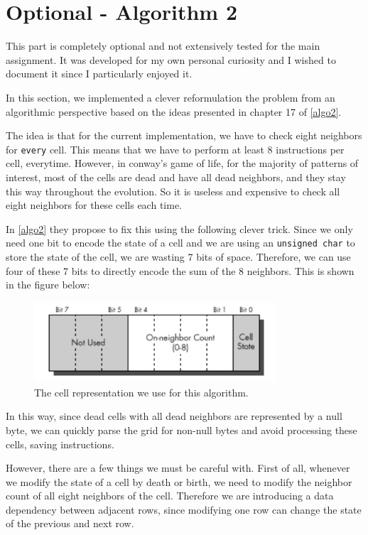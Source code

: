 \documentclass{report}
\begin{document}
\section{Optional - Algorithm 2}

This part is completely optional and not extensively tested for the main 
assignment. It was developed for my own personal curiosity and I wished to 
document it since I particularly enjoyed it. 

In this section, we implemented a clever reformulation the problem from an 
algorithmic perspective based on the ideas presented in chapter 17 of 
\ref{algo2}. 

The idea is that for the current implementation, we have to check eight neighbors 
for \texttt{every} cell. This means that we have to perform at least 8 instructions 
per cell, everytime. However, in conway's game of life, for the majority of 
patterns of interest, most of the cells are dead and have all dead neighbors, 
and they stay this way throughout the evolution. So it is useless and expensive
to check all eight neighbors for these cells each time.

In \ref{algo2} they propose to fix this using the following clever trick. 
Since we only need one bit to encode the state of a cell and we are using an 
\texttt{unsigned char} to store the state of the cell, we are wasting 7 bits 
of space. Therefore, we can use four of these 7 bits to directly encode the 
sum of the 8 neighbors. This is shown in the figure below:

\begin{figure}[H]
    \centering
    \includegraphics[width=9cm, height=3cm]{./other_images/new_cell_rep.png}
    \caption{\label{fig:mpi_multiple} The cell representation we use for this 
    algorithm. }
\end{figure}

In this way, since dead cells with all dead neighbors are represented by a null
byte, we can quickly parse the grid for non-null bytes and avoid processing 
these cells, saving instructions. 

However, there are a few things we must be careful with. First of all, whenever 
we modify the state of a cell by death or birth, we need to modify the neighbor 
count of all eight neighbors of the cell. Therefore we are introducing a data  
dependency between adjacent rows, since modifying one row can change the state 
of the previous and next row. 
\end{document}
